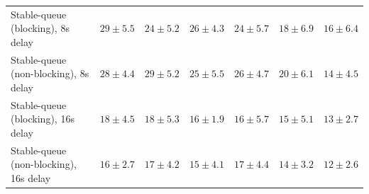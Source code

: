\begin{table}[H]
{\begin{tabular}{l w{c}{5.0em} w{c}{5.0em} w{c}{5.0em} w{c}{5.0em} w{c}{5.0em} w{c}{5.0em}}
Stable-queue (blocking), 8s delay & $29\pm5.5$ & $24\pm5.2$ & $26\pm4.3$ & $24\pm5.7$ & $18\pm6.9$ & $16\pm6.4$ \\
Stable-queue (non-blocking), 8s delay & $28\pm4.4$ & $29\pm5.2$ & $25\pm5.5$ & $26\pm4.7$ & $20\pm6.1$ & $14\pm4.5$ \\
Stable-queue (blocking), 16s delay & $18\pm4.5$ & $18\pm5.3$ & $16\pm1.9$ & $16\pm5.7$ & $15\pm5.1$ & $13\pm2.7$ \\
Stable-queue (non-blocking), 16s delay & $16\pm2.7$ & $17\pm4.2$ & $15\pm4.1$ & $17\pm4.4$ & $14\pm3.2$ & $12\pm2.6$ \\
\bottomrule
\end{tabular}%
}
\end{table}
